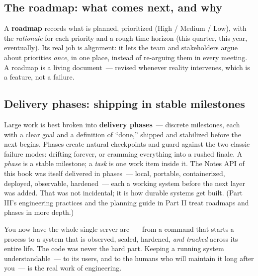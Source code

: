 \subsection*{The roadmap: what comes next, and why}\label{39-local-vs-production:the-roadmap-what-comes-next-and-why}

A \textbf{roadmap} records what is planned, prioritized (High / Medium / Low), with the \emph{rationale} for each priority and a rough time horizon (this quarter, this year, eventually). Its real job is alignment: it lets the team and stakeholders argue about priorities \emph{once}, in one place, instead of re-arguing them in every meeting. A roadmap is a living document~--- revised whenever reality intervenes, which is a feature, not a failure.

\subsection*{Delivery phases: shipping in stable milestones}\label{39-local-vs-production:delivery-phases-shipping-in-stable-milestones}

Large work is best broken into \textbf{delivery phases}~--- discrete milestones, each with a clear goal and a definition of ``done,'' shipped and stabilized before the next begins. Phases create natural checkpoints and guard against the two classic failure modes: drifting forever, or cramming everything into a rushed finale. A \emph{phase} is a stable milestone; a \emph{task} is one work item inside it. The Notes API of this book was itself delivered in phases~--- local, portable, containerized, deployed, observable, hardened~--- each a working system before the next layer was added. That was not incidental; it is how durable systems get built. (Part III's engineering practices and the planning guide in Part II treat roadmaps and phases in more depth.)

You now have the whole single-server arc~--- from a command that starts a process to a system that is observed, scaled, hardened, \emph{and tracked} across its entire life. The code was never the hard part. Keeping a running system understandable~--- to its users, and to the humans who will maintain it long after you~--- is the real work of engineering.


